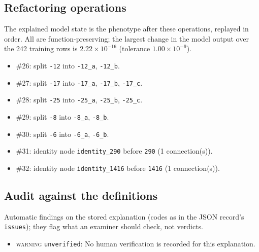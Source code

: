 \begin{drafted}
\subsection{Refactoring operations}\label{app:heart-s5-c2:operations}
The explained model state is the phenotype after these operations, replayed in order. All are function-preserving; the largest change in the model output over the 242 training rows is $2.22\times 10^{-16}$ (tolerance $1.00\times 10^{-9}$).
\begin{itemize}
\item \#26: split \texttt{-12} into \texttt{-12\_\allowbreak{}a}, \texttt{-12\_\allowbreak{}b}.
\item \#27: split \texttt{-17} into \texttt{-17\_\allowbreak{}a}, \texttt{-17\_\allowbreak{}b}, \texttt{-17\_\allowbreak{}c}.
\item \#28: split \texttt{-25} into \texttt{-25\_\allowbreak{}a}, \texttt{-25\_\allowbreak{}b}, \texttt{-25\_\allowbreak{}c}.
\item \#29: split \texttt{-8} into \texttt{-8\_\allowbreak{}a}, \texttt{-8\_\allowbreak{}b}.
\item \#30: split \texttt{-6} into \texttt{-6\_\allowbreak{}a}, \texttt{-6\_\allowbreak{}b}.
\item \#31: identity node \texttt{identity\_\allowbreak{}290} before \texttt{290} (1 connection(s)).
\item \#32: identity node \texttt{identity\_\allowbreak{}1416} before \texttt{1416} (1 connection(s)).
\end{itemize}
\subsection{Audit against the definitions}\label{app:heart-s5-c2:audit}
Automatic findings on the stored explanation (codes as in the JSON record's \texttt{issues}); they flag what an examiner should check, not verdicts.
\begin{itemize}
\item \textsc{warning} \texttt{unverified}: No human verification is recorded for this explanation.
\end{itemize}
\end{drafted}
